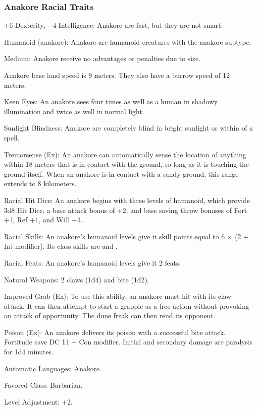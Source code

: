 \subsubsection{Anakore Racial Traits}
\begin{itemize*}
	\item +6 Dexterity, $-4$ Intelligence: Anakore are fast, but they are not smart.
    \item Humanoid (anakore): Anakore are humanoid creatures with the anakore subtype.
	\item Medium: Anakore receive no advantages or penalties due to size.
    \item Anakore base land speed is 9 meters. They also have a burrow speed of 12 meters.

    \item Keen Eyes: An anakore sees four times as well as a human in shadowy illumination and twice as well in normal light.
    \item Sunlight Blindness: Anakore are completely blind in bright sunlight or within of a  spell.
    \item Tremorsense (Ex): An anakore can automatically sense the location of anything within 18 meters that is in contact with the ground, so long as it is touching the ground itself. When an anakore is in contact with a sandy ground, this range extends to 8 kilometers.

    \item Racial Hit Dice: An anakore begins with three levels of humanoid, which provide 3d8 Hit Dice, a base attack bonus of +2, and base saving throw bonuses of Fort +1, Ref +1, and Will +4.
    \item Racial Skills: An anakore's humanoid levels give it skill points equal to 6 $\times$ (2 + Int modifier). Its class skills are  and .
    \item Racial Feats: An anakore's humanoid levels give it 2 feats.

    \item Natural Weapons: 2 claws (1d4) and bite (1d2).

    \item Improved Grab (Ex): To use this ability, an anakore must hit with its claw attack. It can then attempt to start a grapple as a free action without provoking an attack of opportunity. The dune freak can then rend its opponent.
    \item Poison (Ex): An anakore delivers its poison with a successful bite attack. Fortitude save DC 11 + Con modifier. Initial and secondary damage are paralysis for 1d4 minutes.
    \item Automatic Languages: Anakore.
    \item Favored Class: Barbarian.
    \item Level Adjustment: +2.
\end{itemize*}
